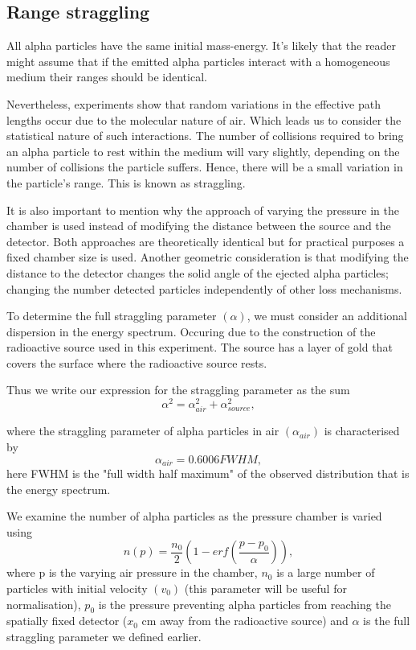 \documentclass[a4paper]{article}
\begin{document}
\begin{multicols}{2}
\subsection{Range straggling}
All alpha particles have the same initial mass-energy. It's likely that the reader might assume that if the emitted alpha particles interact with a homogeneous medium their ranges should be identical.

Nevertheless, experiments show that random variations in the effective path lengths occur due to the molecular nature of air. Which leads us to consider the statistical nature of such interactions. The number of collisions required to bring an alpha particle to rest within the medium will vary slightly, depending on the number of collisions the particle suffers.
Hence, there will be a small variation in the particle's range. This is known as straggling\cite{straggling}.

It is also important to mention why the approach of varying the pressure in the chamber is used instead of modifying the distance between the source and the detector.
Both approaches are theoretically identical but for practical purposes a fixed chamber size is used. Another geometric consideration is that modifying the distance to the detector changes the solid angle of the ejected alpha particles; changing the number detected particles independently of other loss mechanisms\cite{feedback}.

To determine the full straggling parameter $(\alpha)$, we must consider an additional dispersion in the energy spectrum. Occuring due to the construction of the radioactive source used in this experiment. 
The source has a layer of gold that covers the surface where the radioactive source rests\cite{SPA}. 

Thus we write our expression for the straggling parameter as the sum\cite{SPA}
\begin{equation} \alpha^2 = \alpha_{air}^2 + \alpha_{source}^2,
\end{equation}

where the straggling parameter of alpha particles in air $(\alpha_{air})$ is characterised by\cite{SPA} 
\begin{equation} \alpha_{air} = 0.6006 FWHM,
\end{equation}
here FWHM is the "full width half maximum" of the observed distribution that is the energy spectrum. 



We examine the number of alpha particles as the pressure chamber is varied using
\begin{equation} n(p) = \frac{n_0}{2} \left (1- erf \left (\frac{p - p_0}{\alpha}\right )\right ),
\end{equation}
where p is the varying air pressure in the chamber, $n_0$  is a large number of particles with initial velocity $(v_0)$ (this parameter will be useful for normalisation), $p_0$ is the pressure preventing alpha particles from reaching the spatially fixed detector ($x_0$ cm away from the radioactive source) and $\alpha$ is the full straggling parameter we defined earlier\cite{SPA}.


\end{multicols}
\end{document}

